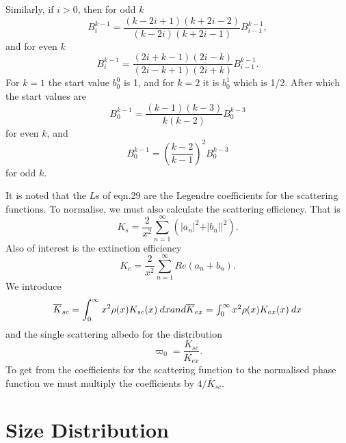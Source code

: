 Similarly, if $i>0$, then for odd $k$
\begin{equation}
B^{k-1}_i=\frac{(k-2i+1)(k+2i-2)}{(k-2i)(k+2i-1)}B^{k-1}_{i-1},
\end{equation} 
and for even $k$
\begin{equation}
B^{k-1}_i=\frac{(2i+k-1)(2i-k)}{(2i-k+1)(2i+k)}B^{k-1}_{i-1}.
\end{equation} 
For $k=1$ the start value $b^0_0$ is 1, and for $k=2$ it is $b^1_0$ which is 1/2.
After which the start values are
\begin{equation}
B^{k-1}_0= \frac{(k-1)(k-3)}{k(k-2)} B^{k-3}_0
\end{equation}
 for even $k$, and
\begin{equation}
B^{k-1}_0= \left (\frac{k-2}{k-1} \right )^2 B^{k-3}_0
\end{equation}
 for odd $k$.

It is noted that the $L$s of eqn.29 are the Legendre coefficients 
for the scattering functions.
To normalise, we must also calculate the scattering efficiency. That is
\begin{equation}
K_s=\frac{2}{x^2}\sum_{n=1}^\infty (\vert a_n \vert^2  +\vert b_n \vert|^ 2).
\end{equation}
Also of interest is the extinction efficiency
\begin{equation}
K_e=\frac{2}{x^2}\sum_{n=1}^\infty Re( a_n+b_n).
\end{equation}
We introduce
\begin{equation}
{\overline K_{sc}}=\int_0^\infty x^2 \rho(x) K_{sc}(x) \> dx
$$   and $$
{\overline K_{ex}}=\int_0^\infty x^2 \rho(x) K_{ex}(x) \> dx
\end{equation}
and the single scattering albedo for the distribution
\begin{equation}
\varpi_0=\frac{K_{sc}}{K_{ex}}.
\end{equation}
To get from the coefficients for the scattering function to the normalised phase 
function we must multiply the coefficients by $4/{\overline K_{sc}}$.

\section{Size Distribution}

